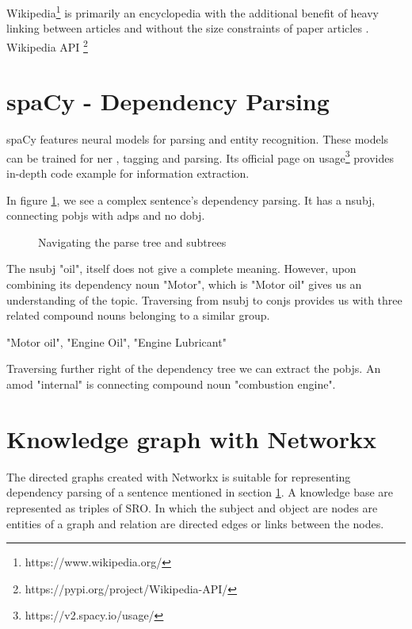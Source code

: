 Wikipedia\footnote{https://www.wikipedia.org/} is primarily an encyclopedia with the additional benefit of heavy linking between articles and without the size constraints of paper articles \parencite{TorstenZesch}. Wikipedia API \footnote{https://pypi.org/project/Wikipedia-API/}

\section{spaCy - Dependency Parsing} \label{dependencyparsing}

spaCy \parencite{spacy2} features neural models for parsing and entity recognition. These models can be trained for \acf{ner} , tagging and parsing. Its official page on usage\footnote {https://v2.spacy.io/usage/} provides in-depth code example for information extraction.

In figure \ref{fig:dp}, we see a complex sentence's dependency parsing. It has a \acf{nsubj}, connecting \acfp{pobj} with \acfp{adp} and no \acf{dobj}.

\begin{figure}[htp!]
    \centering    
    
    \caption{Navigating the parse tree and subtrees}
    \label{fig:dp}
\end{figure}

The \acs{nsubj} "oil", itself does not give a complete meaning. However, upon combining its dependency noun "Motor", which is "Motor oil"  gives us an understanding of the topic. Traversing from \acs{nsubj} to  \acfp{conj} provides us with three related compound nouns belonging to a similar group.

"Motor oil", "Engine Oil", "Engine Lubricant"

Traversing further right of the dependency tree we can extract the \acsp{pobj}.  An \acf{amod} "internal" is connecting compound noun "combustion engine".

\section{Knowledge graph with Networkx}

The directed graphs created with Networkx \parencite{hagberg2008exploring} is suitable for representing dependency parsing of a sentence mentioned in section \ref{dependencyparsing}. A knowledge base are represented as triples of \acf{SRO}. In which the subject and object are nodes are entities of a graph and relation are directed edges or links between the nodes.

